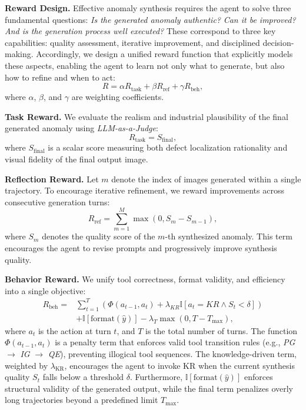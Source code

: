 \documentclass[sigconf]{acmart}
\begin{document}
\noindent\textbf{Reward Design.}
Effective anomaly synthesis requires the agent to solve three fundamental questions: \emph{Is the generated anomaly authentic?} \emph{Can it be improved?} \emph{And is the generation process well executed?} These correspond to three key capabilities: quality assessment, iterative improvement, and disciplined decision-making. Accordingly, we design a unified reward function that explicitly models these aspects, enabling the agent to learn not only what to generate, but also how to refine and when to act:
\begin{equation}
R = \alpha R_{\text{task}} + \beta R_{\text{ref}} + \gamma R_{\text{beh}},
\end{equation}
where $\alpha$, $\beta$, and $\gamma$ are weighting coefficients.

\textbf{Task Reward.}
We evaluate the realism and industrial plausibility of the final generated anomaly using \emph{LLM-as-a-Judge}:
\begin{equation}
R_{\text{task}} = S_{\text{final}},
\end{equation}
where $S_{\text{final}}$ is a scalar score measuring both defect localization rationality and visual fidelity of the final output image.

\textbf{Reflection Reward.}
Let $m$ denote the index of images generated within a single trajectory. To encourage iterative refinement, we reward improvements across consecutive generation turns:
\begin{equation}
    R_{\text{ref}} = \sum_{m=1}^{M} \max(0, S_{m} - S_{m-1}),
\end{equation}
where $S_m$ denotes the quality score of the $m$-th synthesized anomaly. This term encourages the agent to revise prompts and progressively improve synthesis quality.

\textbf{Behavior Reward.}
We unify tool correctness, format validity, and efficiency into a single objective:
\begin{equation}
\begin{aligned}
R_{\text{beh}} =
& \sum_{t=1}^{T} ( \Phi(a_{t-1}, a_t)
+ \lambda_{KR} \mathbb{I}[a_t = KR \land S_t < \delta]) \\
& + \mathbb{I}[\text{format}(\hat{y})]
- \lambda_T \max(0, T - T_{\max}),
\end{aligned}
\end{equation}
where $a_t$ is the action at turn $t$, and $T$ is the total number of turns. The function $\Phi(a_{t-1}, a_t)$ is a penalty term that enforces valid tool transition rules (e.g., \textit{PG} $\rightarrow$ \textit{IG} $\rightarrow$ \textit{QE}), preventing illogical tool sequences. The knowledge-driven term, weighted by $\lambda_{\text{KR}}$, encourages the agent to invoke KR when the current synthesis quality $S_t$ falls below a threshold $\delta$. Furthermore, $\mathbb{I}[\text{format}(\hat{y})]$ enforces structural validity of the generated output, while the final term penalizes overly long trajectories beyond a predefined limit $T_{\max}$.
\end{document}
